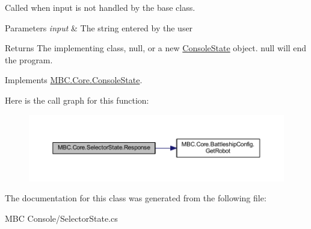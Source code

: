 Called when input is not handled by the base class.


\begin{DoxyParams}{Parameters}
{\em input} & The string entered by the user\\
\hline
\end{DoxyParams}
\begin{DoxyReturn}{Returns}
The implementing class, null, or a new \hyperlink{class_m_b_c_1_1_core_1_1_console_state}{Console\-State} object. null will end the program.
\end{DoxyReturn}


Implements \hyperlink{class_m_b_c_1_1_core_1_1_console_state_aaaa5118a38bedd856e55fa26601a5f3d}{M\-B\-C.\-Core.\-Console\-State}.



Here is the call graph for this function\-:\nopagebreak
\begin{figure}[H]
\begin{center}
\leavevmode
\includegraphics[width=350pt]{class_m_b_c_1_1_core_1_1_selector_state_a5010831a2fe37679042b023a6cd03900_cgraph}
\end{center}
\end{figure}




The documentation for this class was generated from the following file\-:\begin{DoxyCompactItemize}
\item 
M\-B\-C Console/Selector\-State.\-cs\end{DoxyCompactItemize}
